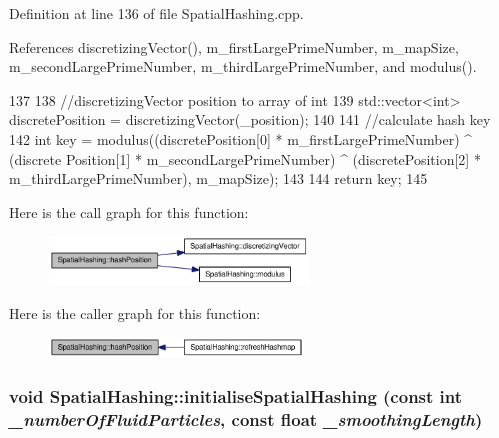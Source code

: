 Definition at line 136 of file SpatialHashing.cpp.



References discretizingVector(), m\_\-firstLargePrimeNumber, m\_\-mapSize, m\_\-secondLargePrimeNumber, m\_\-thirdLargePrimeNumber, and modulus().




\begin{DoxyCode}
137 {
138     //discretizingVector position to array of int
139     std::vector<int> discretePosition = discretizingVector(_position);
140 
141     //calculate hash key
142     int key = modulus((discretePosition[0] * m_firstLargePrimeNumber) ^ (discrete
      Position[1] * m_secondLargePrimeNumber) ^ (discretePosition[2] * 
      m_thirdLargePrimeNumber), m_mapSize);
143 
144     return key;
145 }
\end{DoxyCode}




Here is the call graph for this function:\nopagebreak
\begin{figure}[H]
\begin{center}
\leavevmode
\includegraphics[width=195pt]{class_spatial_hashing_a7bfce8fdfb8f8afe9a23fe1fe39875fe_cgraph}
\end{center}
\end{figure}




Here is the caller graph for this function:\nopagebreak
\begin{figure}[H]
\begin{center}
\leavevmode
\includegraphics[width=191pt]{class_spatial_hashing_a7bfce8fdfb8f8afe9a23fe1fe39875fe_icgraph}
\end{center}
\end{figure}


\hypertarget{class_spatial_hashing_aeb15873f735e15a7b3fa8d3cc211db93}{
\subsubsection[{initialiseSpatialHashing}]{\setlength{\rightskip}{0pt plus 5cm}void SpatialHashing::initialiseSpatialHashing (const int {\em \_\-numberOfFluidParticles}, \/  const float {\em \_\-smoothingLength})}}
\label{class_spatial_hashing_aeb15873f735e15a7b3fa8d3cc211db93}


